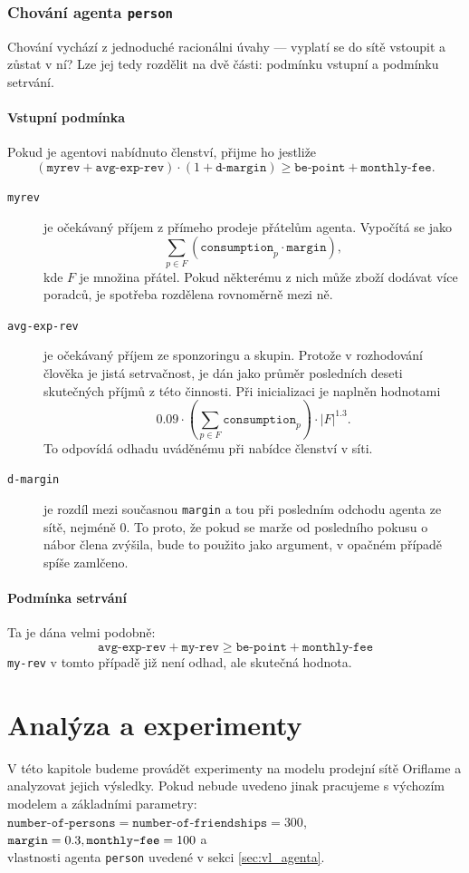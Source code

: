 \documentclass[a4wide,12pt]{report}
\begin{document}
\subsection{Chování agenta \texttt{person}}
Chování vychází z jednoduché racionálni úvahy --- vyplatí se do sítě vstoupit a zůstat v ní? Lze jej tedy rozdělit na dvě části: podmínku vstupní a podmínku setrvání.
\subsubsection{Vstupní podmínka}
Pokud je agentovi nabídnuto členství, přijme ho jestliže
\[(\texttt{myrev} + \texttt{avg-exp-rev}) \cdot (1+\texttt{d-margin}) \geq \texttt{be-point} + \texttt{monthly-fee}.\]
\begin{description}
\item[\texttt{myrev}] je očekávaný příjem z přímeho prodeje přátelům agenta. Vypočítá se jako \[\sum_{p\in F}(\texttt{consumption}_p\cdot\texttt{margin}),\]
kde $F$ je množina přátel. Pokud některému z nich může zboží dodávat více poradců, je spotřeba rozdělena rovnoměrně mezi ně.
\item[\texttt{avg-exp-rev}] je očekávaný příjem ze sponzoringu a skupin. Protože v rozhodování člověka je jistá setrvačnost, je dán jako průměr posledních deseti skutečných příjmů z této činnosti. Při inicializaci je naplněn hodnotami
\[ 0.09\cdot (\sum_{p\in F}\texttt{consumption}_p)\cdot |F|^{1.3}.\]
To odpovídá odhadu uváděnému při nabídce členství v síti.
\item[\texttt{d-margin}] je rozdíl mezi současnou \texttt{margin} a tou při posledním odchodu agenta ze sítě, nejméně 0. To proto, že pokud se marže od posledního pokusu o nábor člena zvýšila, bude to použito jako argument, v opačném případě spíše zamlčeno.
\end{description}
\subsubsection{Podmínka setrvání}
Ta je dána velmi podobně:
\[ \texttt{avg-exp-rev} + \texttt{my-rev} \geq \texttt{be-point} + \texttt{monthly-fee} \]
\texttt{my-rev} v tomto případě již není odhad, ale skutečná hodnota.
%
\chapter{Analýza a experimenty}
V této kapitole budeme provádět experimenty na modelu prodejní sítě Oriflame a analyzovat jejich výsledky. Pokud nebude uvedeno jinak pracujeme s výchozím modelem a základními parametry:\\
$\texttt{number-of-persons}=\texttt{number-of-friendships}=300$, \\
$\texttt{margin}=0.3,\\\texttt{monthly-fee}=100$ a\\
vlastnosti agenta \texttt{person} uvedené v sekci \ref{sec:vl_agenta}.
\end{document}
